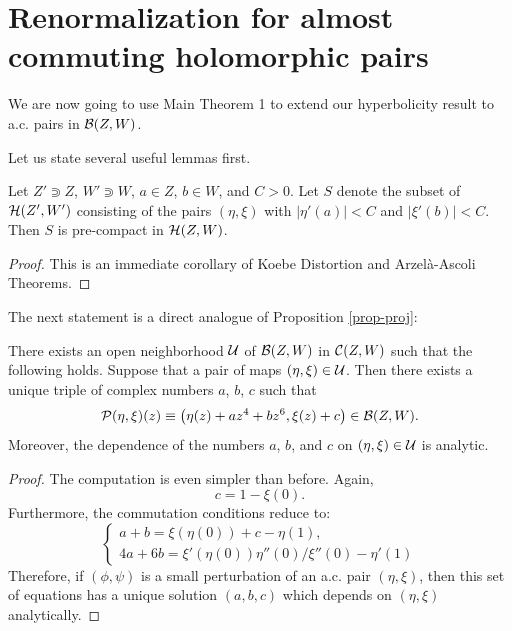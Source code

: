 \section{Renormalization for almost commuting holomorphic pairs}\label{sec:ACM}
We are now going to use Main Theorem 1 to extend our hyperbolicity result to a.c. pairs in $\mathcal{B}(Z,W)$.

Let us state several useful lemmas first.
\begin{lemma}
\label{lem-cpt1}
Let $Z'\Supset Z$, $W'\Supset W$, $a\in Z$, $b\in W$, and $C>0$. Let $S$ denote the subset of $\mathcal{H}(Z',W')$ consisting of the pairs $(\eta,\xi)$
with $|\eta'(a)|<C$ and $|\xi'(b)|<C$. Then $S$ is pre-compact in $\mathcal{H}(Z,W)$.
\end{lemma}
\begin{proof}
This is an immediate corollary of Koebe Distortion and Arzel{\`a}-Ascoli Theorems.
\end{proof} 

The next statement is a direct analogue of Proposition \ref{prop-proj}:
\begin{prop}
\label{prop-proj2}
There exists an open neighborhood $\mathcal{U}$ of $\mathcal{B}(Z,W)$ in $\mathcal{C}(Z,W)$ such that the following holds.
Suppose that a pair of maps $(\eta,\xi) \in \mathcal{U}$. Then there exists a unique triple of complex numbers $a$, $b$, $c$ such that 
\begin{eqnarray}
\mathcal{P} (\eta,\xi)(z)\equiv\left( \eta(z)+a z^4+b z^6, \xi(z)+c \right)\in\mathcal{B}(Z,W).
\end{eqnarray}
Moreover, the dependence of the numbers $a$, $b$, and $c$ on $(\eta,\xi)\in\mathcal{U}$ is analytic.
\end{prop}
\begin{proof}
The computation is even simpler than before. Again, 
\begin{equation}\label{eq:newFs1a}
c=1-\xi(0).
\end{equation}
Furthermore, the commutation conditions reduce to:
$$\left\{ \begin{array}{c}a+b=\xi(\eta(0)) +c -\eta(1),\\
4a+6b=\xi'(\eta(0))\eta''(0)/\xi''(0)-\eta'(1)\end{array}\right.$$
Therefore, if $(\phi,\psi)$ is a small perturbation of  an a.c. pair $(\eta,\xi)$, then this set of equations has a unique solution $(a,b,c)$ which depends on $(\eta,\xi)$ analytically.
\end{proof}

